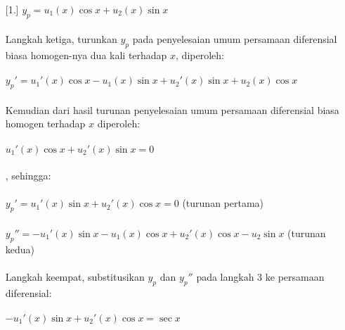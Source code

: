 \begin{enumerate} [1.]
	\begin{math} y_p = u_1 (x) \cos x + u_2 (x) \sin x \end{math} \\ \\
	Langkah ketiga, turunkan \begin{math} y_p \end{math} pada penyelesaian umum persamaan diferensial biasa homogen-nya dua kali terhadap \begin{math} x \end{math}, diperoleh: \\ \\
	\begin{math} y_p ' = u_1 ' (x) \cos x - u_1 (x) \sin x + u_2 ' (x) \sin x + u_2 (x) \cos x \end{math} \\ \\
	Kemudian dari hasil turunan penyelesaian umum persamaan diferensial biasa homogen terhadap \begin{math} x \end{math} diperoleh: \\ \\
	\begin{math} u_1 ' (x) \cos x + u_2 ' (x) \sin x = 0 \end{math} \\ \\
	, sehingga: \\ \\
	\begin{math} y_p ' = u_1 ' (x) \sin x + u_2 ' (x) \cos x = 0 \end{math} (turunan pertama) \\ \\
	\begin{math} y_p '' = -u_1 ' (x) \sin x -u_1 (x) \cos x + u_2 ' (x) \cos x - u_2 \sin x \end{math} (turunan kedua) \\ \\
	Langkah keempat, substitusikan \begin{math} y_p \end{math} dan \begin{math} y_p '' \end{math} pada langkah 3 ke persamaan diferensial: \\ \\
	\begin{math} -u_1 ' (x) \sin x + u_2 ' (x) \cos x = \sec x \end{math} \\ \\

\end{enumerate}
